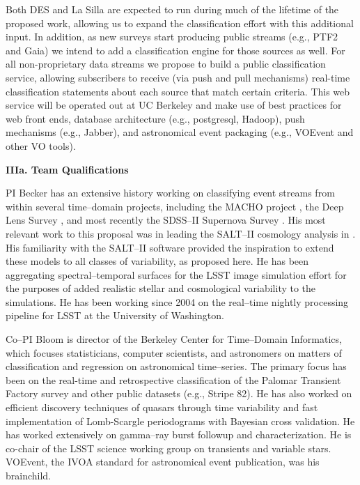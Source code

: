 Both DES and La Silla are expected to run during much of the lifetime of the proposed work, allowing us to expand the classification effort with this additional input. In addition, as new surveys start producing public streams (e.g., PTF2 and Gaia) we intend to add a classification engine for those sources as well.  For all non-proprietary data streams we propose to build a public classification service, allowing subscribers to receive (via push and pull mechanisms) real-time classification statements about each source that match certain criteria. This web service will be operated out at UC Berkeley and make use of best practices for web front ends, database architecture (e.g., postgresql, Hadoop), push mechanisms (e.g., Jabber), and astronomical event packaging (e.g., VOEvent and other VO tools).

\bigskip \centerline{\bf IIIa. Team Qualifications} \smallskip

 \smallskip

PI Becker has an extensive history working on classifying event streams from
within several time--domain projects, including the MACHO project
\citep{2000PhDT.......258B}, the Deep Lens Survey \citep{2004ApJ...611..418B},
and most recently the SDSS--II Supernova Survey
\citep{2008AJ....135..338F,2008AJ....135..348S}.  His most relevant work to this
proposal was in leading the SALT--II cosmology analysis in
\cite{2009ApJS..185...32K}.  His familiarity with the SALT--II software provided
the inspiration to extend these models to all classes of variability, as
proposed here. He has been aggregating spectral--temporal surfaces for the LSST
image simulation effort \citep{2010SPIE.7738E..53C} for the purposes of added
realistic stellar and cosmological variability to the simulations.  He has been
working since 2004 on the real--time nightly processing pipeline for LSST at the
University of Washington.

 \smallskip

Co--PI Bloom is director of the Berkeley Center for Time--Domain Informatics,
which focuses statisticians, computer scientists, and astronomers on matters of
classification and regression on astronomical time--series.  The primary focus
has been on the real-time and retrospective classification of the Palomar
Transient Factory survey and other public datasets (e.g., Stripe 82). He has
also worked on efficient discovery techniques of quasars through time
variability and fast implementation of Lomb-Scargle periodograms with Bayesian
cross validation. He has worked extensively on gamma--ray burst followup and
characterization. He is co-chair of the LSST science working group on transients and variable stars. VOEvent, the IVOA standard for astronomical event publication, was his brainchild.


